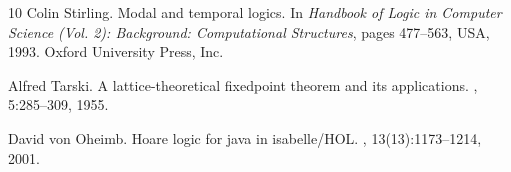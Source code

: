 \documentclass[10pt,a4paper]{amsart}
\theoremstyle{definition}
\begin{document}
\begin{thebibliography}{10}
Colin Stirling.
\newblock Modal and temporal logics.
\newblock In {\em Handbook of Logic in Computer Science (Vol. 2): Background:
  Computational Structures}, pages 477--563, USA, 1993. Oxford University
  Press, Inc.

Alfred Tarski.
\newblock A lattice-theoretical fixedpoint theorem and its applications.
, 5:285--309, 1955.

David von Oheimb.
\newblock Hoare logic for java in isabelle/{HOL}.
,
  13(13):1173--1214, 2001.

\end{thebibliography}
\end{document}
